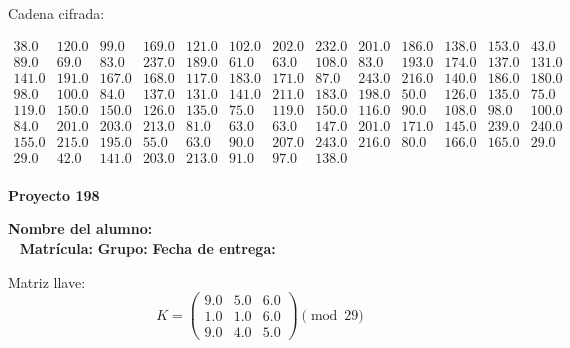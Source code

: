 \documentclass[12pt]{article}
\begin{document}
Cadena cifrada:
\begin{center}
$\begin{array}{lllllllllllll}
38.0 & 120.0 & 99.0 & 169.0 & 121.0 & 102.0 & 202.0 & 232.0 & 201.0 & 186.0 & 138.0 & 153.0 & 43.0\\
89.0 & 69.0 & 83.0 & 237.0 & 189.0 & 61.0 & 63.0 & 108.0 & 83.0 & 193.0 & 174.0 & 137.0 & 131.0\\
141.0 & 191.0 & 167.0 & 168.0 & 117.0 & 183.0 & 171.0 & 87.0 & 243.0 & 216.0 & 140.0 & 186.0 & 180.0\\
98.0 & 100.0 & 84.0 & 137.0 & 131.0 & 141.0 & 211.0 & 183.0 & 198.0 & 50.0 & 126.0 & 135.0 & 75.0\\
119.0 & 150.0 & 150.0 & 126.0 & 135.0 & 75.0 & 119.0 & 150.0 & 116.0 & 90.0 & 108.0 & 98.0 & 100.0\\
84.0 & 201.0 & 203.0 & 213.0 & 81.0 & 63.0 & 63.0 & 147.0 & 201.0 & 171.0 & 145.0 & 239.0 & 240.0\\
155.0 & 215.0 & 195.0 & 55.0 & 63.0 & 90.0 & 207.0 & 243.0 & 216.0 & 80.0 & 166.0 & 165.0 & 29.0\\
29.0 & 42.0 & 141.0 & 203.0 & 213.0 & 91.0 & 97.0 & 138.0\\
\end{array}$
\end{center}

\newpage


\textbf{Proyecto 198}

\textbf{Nombre del alumno:} \underline{\hspace{13cm}}\\\
\vspace{1cm}
\textbf{Matrícula:} \underline{\hspace{4cm}} \hspace{1cm}
\textbf{Grupo:} \underline{\hspace{2cm}}
\textbf{Fecha de entrega:} \underline{\hspace{2cm}}

\medskip

Matriz llave:
\[
K = \begin{pmatrix}
9.0 & 5.0 & 6.0\\
1.0 & 1.0 & 6.0\\
9.0 & 4.0 & 5.0
\end{pmatrix} \pmod{29}
\]
\end{document}
